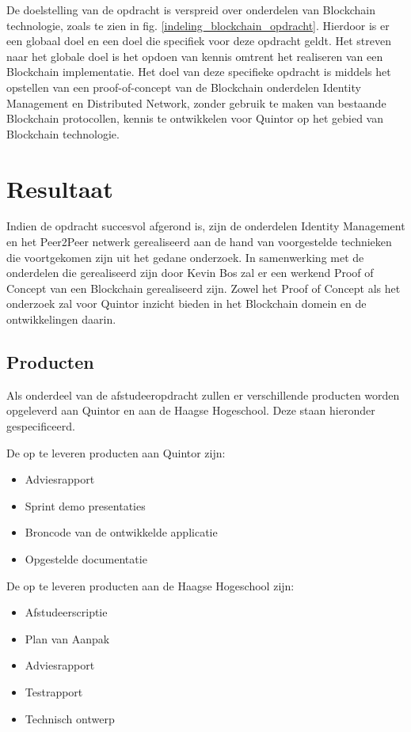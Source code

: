 De doelstelling van de opdracht is verspreid over onderdelen van Blockchain technologie, zoals te zien in fig. \ref{indeling_blockchain_opdracht}. Hierdoor is er een globaal doel en een doel die specifiek voor deze opdracht geldt. Het streven naar het globale doel is het opdoen van kennis omtrent het realiseren van een Blockchain implementatie. Het doel van deze specifieke opdracht is middels het opstellen van een proof-of-concept van de Blockchain onderdelen Identity Management en Distributed Network, zonder gebruik te maken van bestaande Blockchain protocollen, kennis te ontwikkelen voor Quintor op het gebied van Blockchain technologie.

\section{Resultaat}

Indien de opdracht succesvol afgerond is, zijn de onderdelen Identity Management en het Peer2Peer netwerk gerealiseerd aan de hand van voorgestelde technieken die voortgekomen zijn uit het gedane onderzoek. In samenwerking met de onderdelen die gerealiseerd zijn door Kevin Bos zal er een werkend Proof of Concept van een Blockchain gerealiseerd zijn. Zowel het Proof of Concept als het onderzoek zal voor Quintor inzicht bieden in het Blockchain domein en de ontwikkelingen daarin.

\subsection{Producten}

Als onderdeel van de afstudeeropdracht zullen er verschillende producten worden opgeleverd aan Quintor en aan de Haagse Hogeschool. Deze staan hieronder gespecificeerd.

De op te leveren producten aan Quintor zijn:
\begin{itemize}
  \item{Adviesrapport}
  \item{Sprint demo presentaties}
  \item{Broncode van de ontwikkelde applicatie}
  \item{Opgestelde documentatie}
\end{itemize}

De op te leveren producten aan de Haagse Hogeschool zijn:
\begin{itemize}
  \item{Afstudeerscriptie}
  \item{Plan van Aanpak}
  \item{Adviesrapport}
  \item{Testrapport}
  \item{Technisch ontwerp}
\end{itemize}



